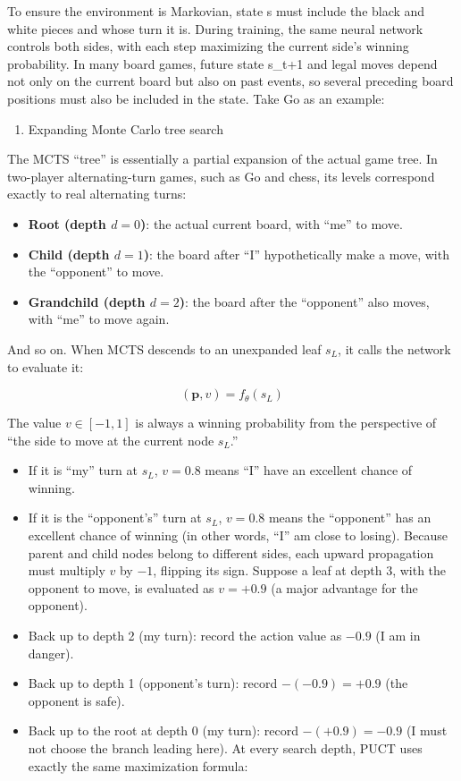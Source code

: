 To ensure the environment is Markovian, state s must include the black and white pieces and whose turn it is. During training, the same neural network controls both sides, with each step maximizing the current side's winning probability. In many board games, future state s\_t+1 and legal moves depend not only on the current board but also on past events, so several preceding board positions must also be included in the state. Take Go as an example:

\begin{enumerate}
\def\labelenumi{(\arabic{enumi})}
\setcounter{enumi}{1}
\tightlist
\item
  Expanding Monte Carlo tree search
\end{enumerate}

The MCTS ``tree'' is essentially a partial expansion of the actual game tree. In two-player alternating-turn games, such as Go and chess, its levels correspond exactly to real alternating turns:

\begin{itemize}
\tightlist
\item
  \textbf{Root (depth \(d=0\))}: the actual current board, with ``me'' to move.
\item
  \textbf{Child (depth \(d=1\))}: the board after ``I'' hypothetically make a move, with the ``opponent'' to move.
\item
  \textbf{Grandchild (depth \(d=2\))}: the board after the ``opponent'' also moves, with ``me'' to move again.
\end{itemize}

And so on. When MCTS descends to an unexpanded leaf \(s_L\), it calls the network to evaluate it:

\[
(\mathbf{p},v)=f_\theta(s_L)
\]

The value \(v\in[-1,1]\) is always a winning probability from the perspective of ``the side to move at the current node \(s_L\).''

\begin{itemize}
\item
  If it is ``my'' turn at \(s_L\), \(v=0.8\) means ``I'' have an excellent chance of winning.
\item
  If it is the ``opponent's'' turn at \(s_L\), \(v=0.8\) means the ``opponent'' has an excellent chance of winning (in other words, ``I'' am close to losing). Because parent and child nodes belong to different sides, each upward propagation must multiply \(v\) by \(-1\), flipping its sign. Suppose a leaf at depth 3, with the opponent to move, is evaluated as \(v=+0.9\) (a major advantage for the opponent).
\item
  Back up to depth 2 (my turn): record the action value as \(-0.9\) (I am in danger).
\item
  Back up to depth 1 (opponent's turn): record \(-(-0.9)=+0.9\) (the opponent is safe).
\item
{}
  Back up to the root at depth 0 (my turn): record \(-(+0.9)=-0.9\) (I must not choose the branch leading here). At every search depth, PUCT uses exactly the same maximization formula:
\end{itemize}

